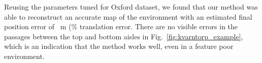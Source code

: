 Reusing the parameters tuned for Oxford dataset, we found that our method was able to reconstruct an accurate map of the environment with an estimated final position error of ~m (\% translation error. There are no visible errors in the passages between the top and bottom aisles in Fig.~\ref{fig:kvarntorp_example}, which is an indication that the method works well, even in a feature poor environment.




%

